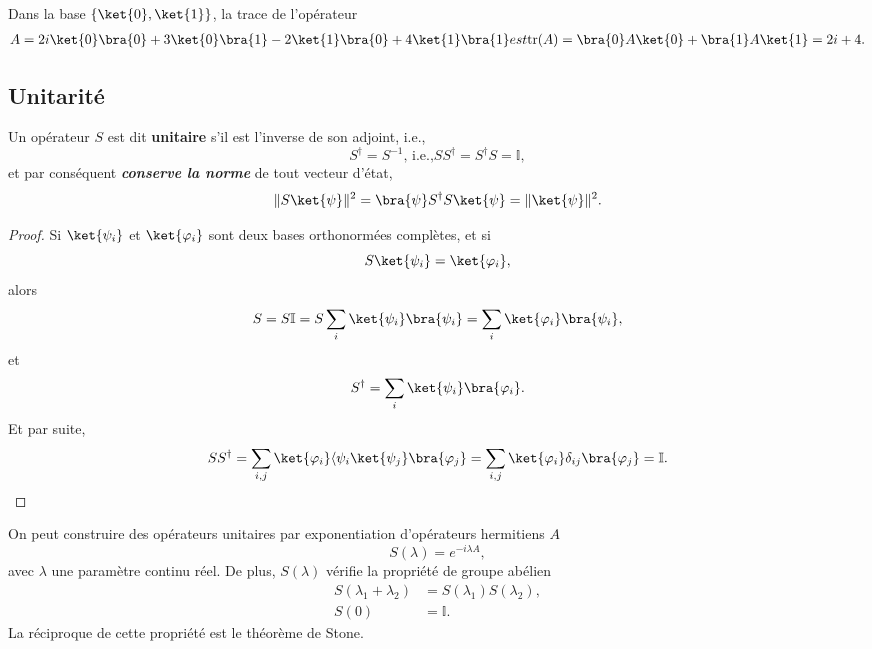 \begin{example}
 Dans la base $\{\ket{0},\ket{1}\}$, la trace de l'opérateur
\begin{subequations}
\begin{align}
 A=2i\ket{0}\bra{0}+3\ket{0}\bra{1}-2\ket{1}\bra{0}+4\ket{1}\bra{1}
\end{align}
est
\begin{align}
\opn{tr}(A)=\bra{0}A\ket{0}+\bra{1}A\ket{1}=2i+4.
\end{align}
\end{subequations}
\end{example}

\subsection{Unitarité}

Un opérateur $S$ est dit \textbf{unitaire} s'il est l'inverse de son adjoint,
i.e.,
\begin{equation}
S^{\dag}=S^{-1}\text{, i.e.,} SS^{\dagger}=S^{\dagger}S=\mathbb{I},
\end{equation}
et par conséquent \emph{\textbf{conserve la norme}} de tout vecteur d'état,
\begin{equation}
\|S\ket{\psi}\|^2 =\bra{\psi}S^{\dagger}S\ket{\psi}=\|\ket{\psi}\|^2.
\end{equation}

\begin{proof}
Si $\ket{\psi_{i}}$ et $\ket{\varphi_{i}}$ sont deux bases orthonormées
complètes, et si
\begin{equation}
S\ket{\psi_{i}}=\ket{\varphi_{i}},
\end{equation}
alors
\begin{equation}
S=S\mathbb{I}=S\sum_{i}\ket{\psi_{i}}\bra{\psi_{i}}=\sum_{i}\ket{\varphi_{i}}
\bra{\psi_{i}},
\end{equation}
et
\begin{equation}
S^{\dagger}=\sum_{i}\ket{\psi_{i}}\bra{\varphi_{i}}.
\end{equation}
Et par suite,
\begin{equation}
SS^{\dagger}=\sum_{i,j}\ket{\varphi_{i}}\langle\psi_{i}\ket{\psi_{j}}
\bra{\varphi_{j}}=\sum_{i,j}\ket{\varphi_{i}}\delta_{ij}\bra{\varphi_{j}}
=\mathbb{I}.
\end{equation}

\end{proof}

On peut construire des opérateurs unitaires par exponentiation d'opérateurs
hermitiens $A$%
\begin{equation}
S(\lambda)=e^{-i\lambda A},
\label{eq:Sexp}%
\end{equation}
avec $\lambda$ une paramètre continu réel. De plus, $S(\lambda)
$ vérifie la propriété de groupe abélien%
\begin{subequations}%
\begin{align}
S(\lambda_1+\lambda_{2}) &  =S(\lambda_1)S(\lambda_{2}),\\
S(0) &  =\mathbb{I}.
\end{align}%
\end{subequations}%
La réciproque de cette propriété est le théorème de Stone.

